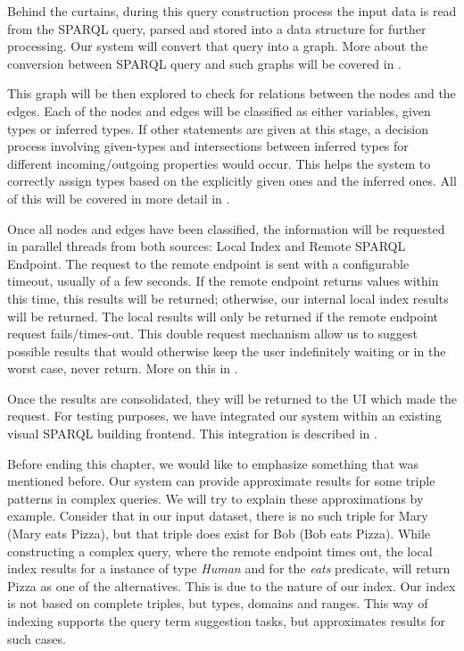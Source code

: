 Behind the curtains, during this query construction process the input data is read from the SPARQL query, parsed and stored into a data structure for further processing. 
Our system will convert that query into a graph. 
More about the conversion between SPARQL query and such graphs will be covered in .

This graph will be then explored to check for relations between the nodes and the edges. 
Each of the nodes and edges will be classified as either variables, given types or inferred types. 
If other statements are given at this stage, a decision process involving given-types and intersections between inferred types for different incoming/outgoing properties would occur. 
This helps the system to correctly assign types based on the explicitly given ones and the inferred ones. 
All of this will be covered in more detail in .

Once all nodes and edges have been classified, the information will be requested in parallel threads from both sources: 
Local Index and Remote SPARQL Endpoint. 
The request to the remote endpoint is sent with a configurable timeout, usually of a few seconds. 
If the remote endpoint returns values within this time, this results will be returned; otherwise, our internal local index results will be returned. The local results will only be returned if the remote endpoint request fails/times-out. 
This double request mechanism allow us to suggest possible results that would otherwise keep the user indefinitely waiting or in the worst case, never return. 
More on this in .

Once the results are consolidated, they will be returned to the UI which made the request. 
For testing purposes, we have integrated our system within an existing visual SPARQL building frontend. 
This integration is described in .

Before ending this chapter, we would like to emphasize something that was mentioned before. 
Our system can provide approximate results for some triple patterns in complex queries. 
We will try to explain these approximations by example. 
Consider that in our input dataset, there is no such triple for Mary (Mary eats Pizza), but that triple does exist for Bob (Bob eats Pizza). 
While constructing a complex query, where the remote endpoint times out, the local index results for a instance of type \textit{Human} and for the \textit{eats} predicate, will return Pizza as one of the alternatives.
This is due to the nature of our index.
Our index is not based on complete triples, but types, domains and ranges.
This way of indexing supports the query term suggestion tasks, but approximates results for such cases.